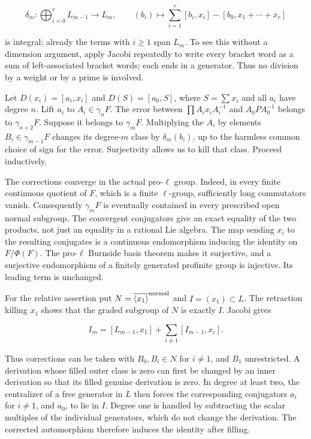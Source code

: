 \documentclass[10pt,a4paper]{article}
\begin{document}
\[
\delta_m:\bigoplus_{i=0}^r L_{m-1}\longrightarrow L_m,
\qquad (b_i)\longmapsto\sum_{i=1}^r[b_i,x_i]-[b_0,x_1+\cdots+x_r]
\]

is integral: already the terms with \(i\geq1\) span \(L_m\). To see this without a dimension argument, apply Jacobi repeatedly to write every bracket word as a sum of left-associated bracket words; each ends in a generator. Thus no division by a weight or by a prime is involved.

Let \(D(x_i)=[a_i,x_i]\) and \(D(S)=[a_0,S]\), where \(S=\sum x_i\) and all \(a_i\) have degree \(n\). Lift \(a_i\) to \(A_i\in\gamma_nF\). The error between \(\prod A_ix_iA_i^{-1}\) and \(A_0PA_0^{-1}\) belongs to \(\gamma_{n+2}F\). Suppose it belongs to \(\gamma_mF\). Multiplying the \(A_i\) by elements \(B_i\in\gamma_{m-1}F\) changes its degree-\(m\) class by \(\delta_m(b_i)\), up to the harmless common choice of sign for the error. Surjectivity allows us to kill that class. Proceed inductively.

The corrections converge in the actual pro-\(\ell\) group. Indeed, in every finite continuous quotient of \(F\), which is a finite \(\ell\)-group, sufficiently long commutators vanish. Consequently \(\gamma_mF\) is eventually contained in every prescribed open normal subgroup. The convergent conjugators give an exact equality of the two products, not just an equality in a rational Lie algebra. The map sending \(x_i\) to the resulting conjugates is a continuous endomorphism inducing the identity on \(F/\Phi(F)\). The pro-\(\ell\) Burnside basis theorem makes it surjective, and a surjective endomorphism of a finitely generated profinite group is injective. Its leading term is unchanged.

For the relative assertion put \(N=\overline{\langle x_1\rangle}^{\rm normal}\) and \(I=(x_1)\subset L\). The retraction killing \(x_1\) shows that the graded subgroup of \(N\) is exactly \(I\). Jacobi gives

\[
 I_m=[L_{m-1},x_1]+\sum_{i\ne1}[I_{m-1},x_i].
\]

Thus corrections can be taken with \(B_0,B_i\in N\) for \(i\ne1\), and \(B_1\) unrestricted. A derivation whose filled outer class is zero can first be changed by an inner derivation so that its filled genuine derivation is zero. In degree at least two, the centralizer of a free generator in \(L\) then forces the corresponding conjugators \(a_i\) for \(i\ne1\), and \(a_0\), to lie in \(I\). Degree one is handled by subtracting the scalar multiples of the individual generators, which do not change the derivation. The corrected automorphism therefore induces the identity after filling.
\end{document}
